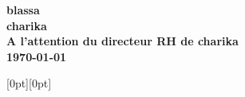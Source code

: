 \documentclass[a4paper, 12pt]{letter}
\begin{document}
\begin{letter}
{{{    \bfseries
    blassa\\
    charika  \\A l'attention du directeur RH de charika   \\
      \today
    }
  }%
}

\hspace{13cm}%
\raisebox{-1cm}[0pt][0pt]{
\setlength{\fboxrule}{0pt}
}




\end{letter}
\end{document}
